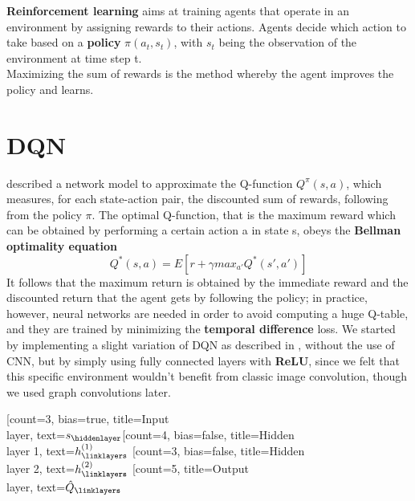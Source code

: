 \textbf{Reinforcement learning} aims at training agents that operate in an environment by assigning rewards to their actions. Agents decide which action to take based on a \textbf{policy} $\pi(a_t, s_t)$, with $s_t$ being the observation of the environment at time step t. \\
Maximizing the sum of rewards is the method whereby the agent improves the policy and learns.

\section{DQN}
\cite{dqn} described a network model to approximate the Q-function $Q^{\pi}(s,a)$, which measures, for each state-action pair, the discounted sum of rewards, following from the policy $\pi$. The optimal Q-function, that is the maximum reward which can be obtained by performing a certain action a in state s, obeys the \textbf{Bellman optimality equation} $$Q^*(s,a) = E[r + \gamma max_{a'}Q^*(s', a')]$$
It follows that the maximum return is obtained by the immediate reward and the discounted return that the agent gets by following the policy; in practice, however, neural networks are needed in order to avoid computing a huge Q-table, and they are trained by minimizing the \textbf{temporal difference} loss.  
We started by implementing a slight variation of DQN as described in \cite{dqn}, without the use of CNN, but by simply using fully connected layers with \textbf{ReLU}, since we felt that this specific environment wouldn't benefit from classic image convolution, though we used graph convolutions later. \\
\begin{center}
\begin{neuralnetwork} [nodespacing=10mm, layerspacing=25mm,
			maintitleheight=2.5em, layertitleheight=2.5em,
			height=5, toprow=false, nodesize=17pt, style={},
			title={}, titlestyle={}]
		        \newcommand{\x}[2]{$s_#2$}
		        \newcommand{\y}[2]{$\hat{Q}_#2$}
		        \newcommand{\hfirst}[2]{\small $h^{(1)}_#2$}
		        \newcommand{\hsecond}[2]{\small $h^{(2)}_#2$}
		        [count=3, bias=true, title=Input\\layer, text=\x]
		        \hiddenlayer[count=4, bias=false, title=Hidden\\layer 1, text=\hfirst] \linklayers
		        \hiddenlayer[count=3, bias=false, title=Hidden\\layer 2, text=\hsecond] \linklayers
		        \outputlayer[count=5, title=Output\\layer, text=\y] \linklayers
\end{neuralnetwork}
\end{center}
	

